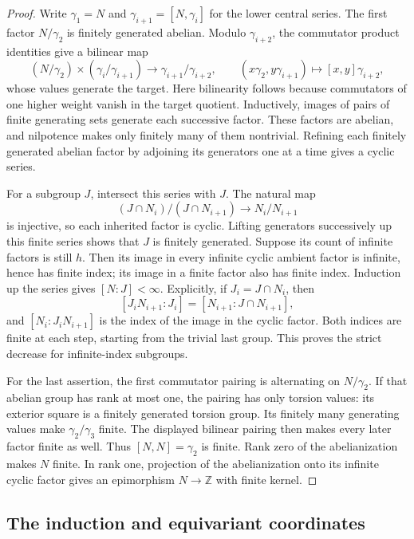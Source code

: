 \documentclass[11pt]{article}
\theoremstyle{definition}
\begin{document}
\begin{proof}
Write $\gamma_1=N$ and $\gamma_{i+1}=[N,\gamma_i]$ for the lower
central series. The first factor $N/\gamma_2$ is finitely generated
abelian. Modulo $\gamma_{i+2}$, the commutator product identities give
a bilinear map
\[
 (N/\gamma_2)\times(\gamma_i/\gamma_{i+1})
 \longrightarrow\gamma_{i+1}/\gamma_{i+2},
 \qquad (x\gamma_2,y\gamma_{i+1})\longmapsto[x,y]\gamma_{i+2},
\]
whose values generate the target. Here bilinearity follows because
commutators of one higher weight vanish in the target quotient.
Inductively, images of pairs of finite generating sets generate each
successive factor. These factors are abelian, and nilpotence makes
only finitely many of them nontrivial. Refining each finitely generated
abelian factor by adjoining its generators one at a time gives a
cyclic series.

For a subgroup $J$, intersect this series with $J$. The natural map
\[
 (J\cap N_i)/(J\cap N_{i+1})\longrightarrow N_i/N_{i+1}
\]
is injective, so each inherited factor is cyclic. Lifting generators
successively up this finite series shows that $J$ is finitely generated.
Suppose its count of infinite factors is still $h$. Then its image in
every infinite cyclic ambient factor is infinite, hence has finite
index; its image in a finite factor also has finite index. Induction
up the series gives $[N:J]<\infty$. Explicitly, if
$J_i=J\cap N_i$, then
\[
 [J_iN_{i+1}:J_i]=[N_{i+1}:J\cap N_{i+1}],
\]
and $[N_i:J_iN_{i+1}]$ is the index of the image in the cyclic factor.
Both indices are finite at each step, starting from the trivial last
group. This proves the strict decrease for infinite-index subgroups.

For the last assertion, the first commutator pairing is alternating
on $N/\gamma_2$. If that abelian group has rank at most one, the
pairing has only torsion values: its exterior square is a finitely
generated torsion group. Its finitely many generating values make
$\gamma_2/\gamma_3$ finite. The displayed bilinear pairing then makes every later factor
finite as well. Thus $[N,N]=\gamma_2$ is finite. Rank zero of the
abelianization makes $N$ finite. In rank one, projection of the
abelianization onto its infinite cyclic factor gives an epimorphism
$N\to\mathbb Z$ with finite kernel.
\end{proof}

\subsection{The induction and equivariant coordinates}
\end{document}
